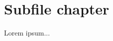 \documentclass[../main.tex]{subfiles}
\begin{document}
\chapter{Subfile chapter}
Lorem ipsum...



\end{document}
